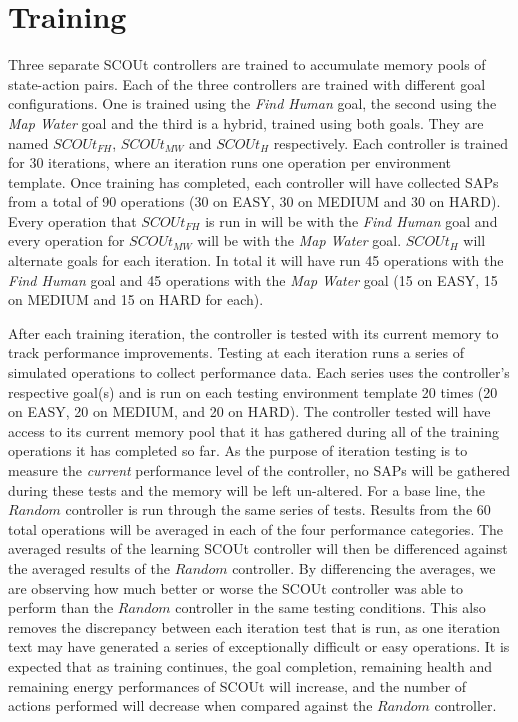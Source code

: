 \section{Training} \label{sec:training}
Three separate SCOUt controllers are trained to accumulate memory pools of state-action pairs.
Each of the three controllers are trained with different goal configurations.
One is trained using the \textit{Find Human} goal, the second using the \textit{Map Water} goal and the third is a hybrid, trained using both goals.
They are named $SCOUt_{FH}$, $SCOUt_{MW}$ and $SCOUt_{H}$ respectively.
Each controller is trained for 30 iterations, where an iteration runs one operation per environment template.
Once training has completed, each controller will have collected SAPs from a total of 90 operations (30 on EASY, 30 on MEDIUM and 30 on HARD).
Every operation that $SCOUt_{FH}$ is run in will be with the \textit{Find Human} goal and every operation for $SCOUt_{MW}$ will be with the \textit{Map Water} goal.
$SCOUt_{H}$ will alternate goals for each iteration.
In total it will have run 45 operations with the \textit{Find Human} goal and 45 operations with the \textit{Map Water} goal (15 on EASY, 15 on MEDIUM and 15 on HARD for each).

After each training iteration, the controller is tested with its current memory to track performance improvements.
Testing at each iteration runs a series of simulated operations to collect performance data.
Each series uses the controller's respective goal(s) and is run on each testing environment template 20 times (20 on EASY, 20 on MEDIUM, and 20 on HARD).
The controller tested will have access to its current memory pool that it has gathered during all of the training operations it has completed so far.
As the purpose of iteration testing is to measure the \textit{current} performance level of the controller, no SAPs will be gathered during these tests and the memory will be left un-altered.
For a base line, the $Random$ controller is run through the same series of tests.
Results from the 60 total operations will be averaged in each of the four performance categories.
The averaged results of the learning SCOUt controller will then be differenced against the averaged results of the $Random$ controller.
By differencing the averages, we are observing how much better or worse the SCOUt controller was able to perform than the $Random$ controller in the same testing conditions.
This also removes the discrepancy between each iteration test that is run, as one iteration text may have generated a series of exceptionally difficult or easy operations.
It is expected that as training continues, the goal completion, remaining health and remaining energy performances of SCOUt will increase, and the number of actions performed will decrease when compared against the $Random$ controller.

